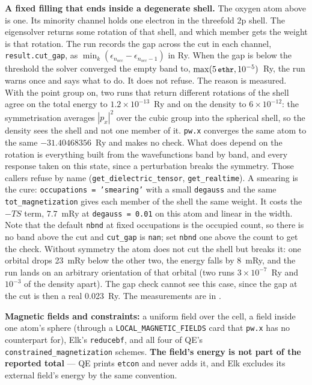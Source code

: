 \documentclass[11pt,a4paper]{article}
\newcommand{\code}[1]{\texttt{\small #1}}
\begin{document}
\textbf{A fixed filling that ends inside a degenerate shell.} The oxygen atom
above is one. Its minority channel holds one electron in the threefold 2p shell.
The eigensolver returns some rotation of that shell, and which member gets the
weight is that rotation. The run records the gap across the cut in each channel,
\code{result.cut\_gap}, as $\min_k (\epsilon_{n_\mathrm{occ}} -
\epsilon_{n_\mathrm{occ}-1})$ in Ry. When the gap is below the threshold the
solver converged the empty band to, $\max(5\,\code{ethr}, 10^{-5})$~Ry, the run
warns once and says what to do. It does not refuse. The reason is measured. With
the point group on, two runs that return different rotations of the shell agree
on the total energy to $1.2\times10^{-13}$~Ry and on the density to
$6\times10^{-12}$: the symmetrisation averages $|p_x|^2$ over the cubic group
into the spherical shell, so the density sees the shell and not one member of it.
\code{pw.x} converges the same atom to the same $-31.40468356$~Ry and makes no
check. What does depend on the rotation is everything built from the
wavefunctions band by band, and every response taken on this state, since a
perturbation breaks the symmetry. Those callers refuse by name
(\code{get\_dielectric\_tensor}, \code{get\_realtime}). A smearing is the cure:
\code{occupations = 'smearing'} with a small \code{degauss} and the same
\code{tot\_magnetization} gives each member of the shell the same weight. It
costs the $-TS$ term, $7.7$~mRy at \code{degauss = 0.01} on this atom and
linear in the width. Note that the default \code{nbnd} at fixed occupations is
the occupied count, so there is no band above the cut and \code{cut\_gap} is
\code{nan}; set \code{nbnd} one above the count to get the check. Without
symmetry the atom does not cut the shell but breaks it: one orbital drops
23~mRy below the other two, the energy falls by 8~mRy, and the run lands on an
arbitrary orientation of that orbital (two runs $3\times10^{-7}$~Ry and
$10^{-3}$ of the density apart). The gap check cannot see this case, since the
gap at the cut is then a real 0.023~Ry. The measurements are in
.

\textbf{Magnetic fields and constraints:} a uniform field over the cell, a field
inside one atom's sphere (through a \code{LOCAL\_MAGNETIC\_FIELDS} card that
\code{pw.x} has no counterpart for), Elk's \code{reducebf}, and all four of QE's
\code{constrained\_magnetization} schemes. \textbf{The field's energy is not part
of the reported total} --- QE prints \code{etcon} and never adds it, and Elk
excludes its external field's energy by the same convention.
\end{document}
